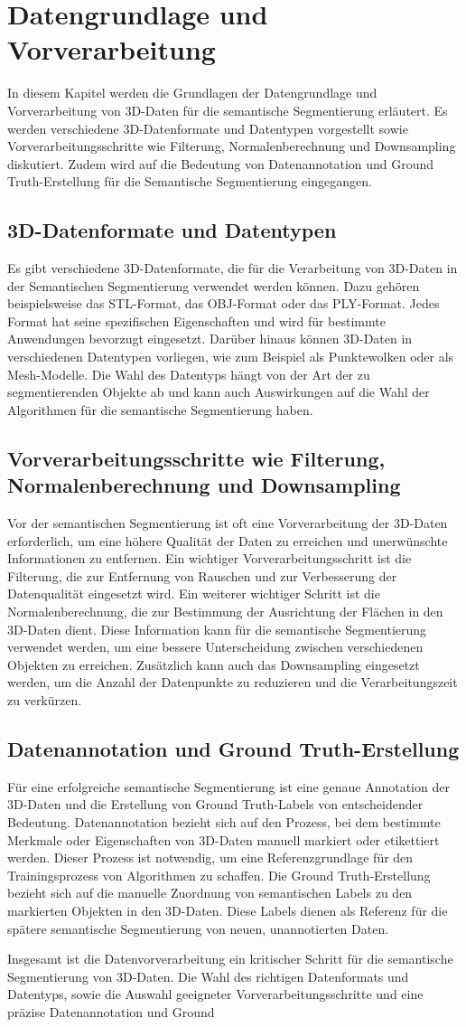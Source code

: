 \chapter{Datengrundlage und Vorverarbeitung}
In diesem Kapitel werden die Grundlagen der Datengrundlage und Vorverarbeitung
von 3D-Daten für die semantische Segmentierung erläutert. Es werden
verschiedene 3D-Datenformate und Datentypen vorgestellt sowie
Vorverarbeitungsschritte wie Filterung, Normalenberechnung und Downsampling
diskutiert. Zudem wird auf die Bedeutung von Datenannotation und Ground
Truth-Erstellung für die Semantische Segmentierung eingegangen.
\section{3D-Datenformate und Datentypen}
Es gibt verschiedene 3D-Datenformate, die für die Verarbeitung von 3D-Daten in
der Semantischen Segmentierung verwendet werden können. Dazu gehören
beispielsweise das STL-Format, das OBJ-Format oder das PLY-Format. Jedes Format
hat seine spezifischen Eigenschaften und wird für bestimmte Anwendungen
bevorzugt eingesetzt. Darüber hinaus können 3D-Daten in verschiedenen
Datentypen vorliegen, wie zum Beispiel als Punktewolken oder als Mesh-Modelle.
Die Wahl des Datentyps hängt von der Art der zu segmentierenden Objekte ab und
kann auch Auswirkungen auf die Wahl der Algorithmen für die semantische
Segmentierung haben.
\section{Vorverarbeitungsschritte wie Filterung, Normalenberechnung und Downsampling}
Vor der semantischen Segmentierung ist oft eine Vorverarbeitung der 3D-Daten
erforderlich, um eine höhere Qualität der Daten zu erreichen und unerwünschte
Informationen zu entfernen. Ein wichtiger Vorverarbeitungsschritt ist die
Filterung, die zur Entfernung von Rauschen und zur Verbesserung der
Datenqualität eingesetzt wird. Ein weiterer wichtiger Schritt ist die
Normalenberechnung, die zur Bestimmung der Ausrichtung der Flächen in den
3D-Daten dient. Diese Information kann für die semantische Segmentierung
verwendet werden, um eine bessere Unterscheidung zwischen verschiedenen
Objekten zu erreichen. Zusätzlich kann auch das Downsampling eingesetzt werden,
um die Anzahl der Datenpunkte zu reduzieren und die Verarbeitungszeit zu
verkürzen.
\section{Datenannotation und Ground Truth-Erstellung}
Für eine erfolgreiche semantische Segmentierung ist eine genaue Annotation der
3D-Daten und die Erstellung von Ground Truth-Labels von entscheidender
Bedeutung. Datenannotation bezieht sich auf den Prozess, bei dem bestimmte
Merkmale oder Eigenschaften von 3D-Daten manuell markiert oder etikettiert
werden. Dieser Prozess ist notwendig, um eine Referenzgrundlage für den
Trainingsprozess von Algorithmen zu schaffen. Die Ground Truth-Erstellung
bezieht sich auf die manuelle Zuordnung von semantischen Labels zu den
markierten Objekten in den 3D-Daten. Diese Labels dienen als Referenz für die
spätere semantische Segmentierung von neuen, unannotierten Daten.

Insgesamt ist die Datenvorverarbeitung ein kritischer Schritt für die
semantische Segmentierung von 3D-Daten. Die Wahl des richtigen Datenformats und
Datentyps, sowie die Auswahl geeigneter Vorverarbeitungsschritte und eine
präzise Datenannotation und Ground